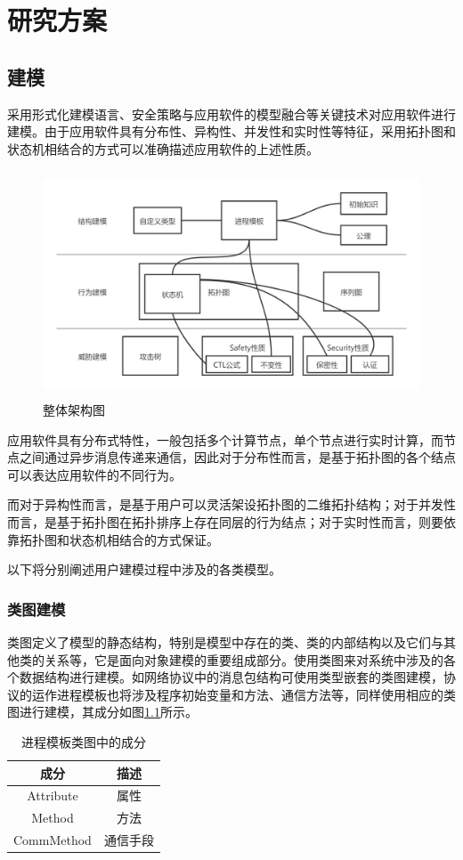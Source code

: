 \chapter{研究方案}

\section{建模}
采用形式化建模语言、安全策略与应用软件的模型融合等关键技术对应用软件进行建模。由于应用软件具有分布性、异构性、并发性和实时性等特征，采用拓扑图和状态机相结合的方式可以准确描述应用软件的上述性质。
\par
\begin{figure}[h]
	\centering
	\includegraphics[width=12cm,height=6.75cm]{imgs/architecture.png}
	\caption{整体架构图}
	\label{architecture}
\end{figure}
\par
应用软件具有分布式特性，一般包括多个计算节点，单个节点进行实时计算，而节点之间通过异步消息传递来通信，因此对于分布性而言，是基于拓扑图的各个结点可以表达应用软件的不同行为。
\par
而对于异构性而言，是基于用户可以灵活架设拓扑图的二维拓扑结构；对于并发性而言，是基于拓扑图在拓扑排序上存在同层的行为结点；对于实时性而言，则要依靠拓扑图和状态机相结合的方式保证。
\par
以下将分别阐述用户建模过程中涉及的各类模型。

\subsection{类图建模}
类图定义了模型的静态结构，特别是模型中存在的类、类的内部结构以及它们与其他类的关系等，它是面向对象建模的重要组成部分。使用类图来对系统中涉及的各个数据结构进行建模。如网络协议中的消息包结构可使用类型嵌套的类图建模，协议的运作进程模板也将涉及程序初始变量和方法、通信方法等，同样使用相应的类图进行建模，其成分如图\ref{process}所示。
\begin{table}[h]
	\centering
	\begin{tabular}{|c|c|}
		\hline
		\textbf{成分} & \textbf{描述} \\ \hline
		Attribute           & 属性          \\ \hline
		Method              & 方法          \\ \hline
		CommMethod          & 通信手段        \\ \hline
	\end{tabular}
	\caption{进程模板类图中的成分}
	\label{process}
\end{table}

